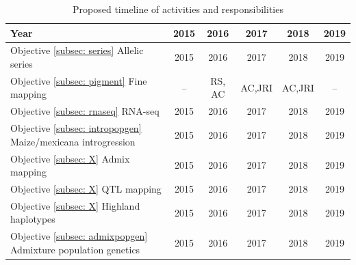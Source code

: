 









\begin{table}[H]
\begin{center}
\caption{Proposed timeline of activities and responsibilities}\label{timeline}
\begin{tabular}{lccccc}\\\toprule  
    \rowcolor{gray!50}
Year & 2015 & 2016 & 2017 & 2018 & 2019 \\\midrule
Objective \ref{subsec: series} Allelic series & 2015 & 2016 & 2017 & 2018 & 2019\\\midrule
Objective \ref{subsec: pigment} Fine mapping & -- & RS, AC & AC,JRI & AC,JRI & -- \\\midrule
Objective \ref{subsec: rnaseq} RNA-seq & 2015 & 2016 & 2017 & 2018 & 2019\\\midrule
Objective \ref{subsec: intropopgen} Maize/mexicana introgression & 2015 & 2016 & 2017 & 2018 & 2019 \\\midrule
Objective \ref{subsec: X} Admix mapping & 2015 & 2016 & 2017 & 2018 & 2019 \\\midrule
Objective \ref{subsec: X} QTL mapping & 2015 & 2016 & 2017 & 2018 & 2019 \\\midrule
Objective \ref{subsec: X} Highland haplotypes & 2015 & 2016 & 2017 & 2018 & 2019 \\\midrule
Objective \ref{subsec: admixpopgen} Admixture population genetics & 2015 & 2016 & 2017 & 2018 & 2019\\ \bottomrule
\end{tabular}
\end{center}
\end{table} 



